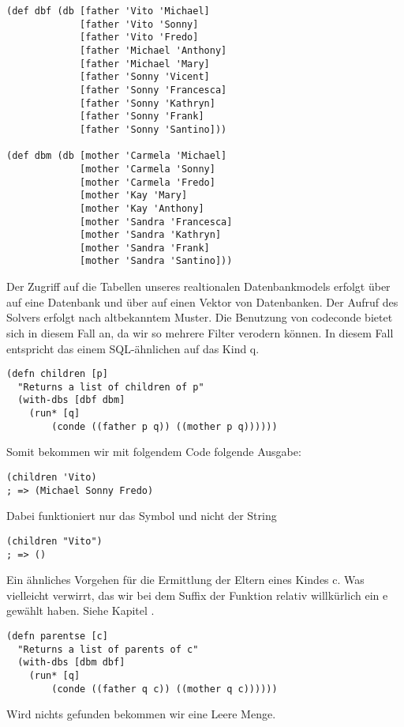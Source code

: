 \begin{lstlisting}
(def dbf (db [father 'Vito 'Michael]
             [father 'Vito 'Sonny]
             [father 'Vito 'Fredo]
             [father 'Michael 'Anthony]
             [father 'Michael 'Mary]
             [father 'Sonny 'Vicent]
             [father 'Sonny 'Francesca]
             [father 'Sonny 'Kathryn]
             [father 'Sonny 'Frank]
             [father 'Sonny 'Santino]))
 
(def dbm (db [mother 'Carmela 'Michael]
             [mother 'Carmela 'Sonny]
             [mother 'Carmela 'Fredo]
             [mother 'Kay 'Mary]
             [mother 'Kay 'Anthony]
             [mother 'Sandra 'Francesca]
             [mother 'Sandra 'Kathryn]
             [mother 'Sandra 'Frank]
             [mother 'Sandra 'Santino]))
\end{lstlisting}
Der Zugriff auf die Tabellen unseres realtionalen Datenbankmodels erfolgt über  auf eine Datenbank und über  auf einen Vektor von Datenbanken. Der Aufruf des Solvers erfolgt nach altbekanntem Muster. Die Benutzung von code{conde} bietet sich in diesem Fall an, da wir so mehrere Filter verodern können. In diesem Fall entspricht das einem SQL-ähnlichen  auf das Kind q.

\begin{lstlisting}
(defn children [p] 
  "Returns a list of children of p"
  (with-dbs [dbf dbm] 
	(run* [q] 
		(conde ((father p q)) ((mother p q))))))
\end{lstlisting}
Somit bekommen wir mit folgendem Code folgende Ausgabe:

\begin{lstlisting}
(children 'Vito)
; => (Michael Sonny Fredo)
\end{lstlisting}
Dabei funktioniert nur das Symbol  und nicht der String 

\begin{lstlisting}
(children "Vito")
; => ()
\end{lstlisting}
Ein ähnliches Vorgehen für die Ermittlung der Eltern eines Kindes \dq{}c\dq{}. Was vielleicht verwirrt, das wir bei dem Suffix der Funktion relativ willkürlich ein e gewählt haben. Siehe Kapitel \emph{}.

\begin{lstlisting}
(defn parentse [c] 
  "Returns a list of parents of c"
  (with-dbs [dbm dbf] 
	(run* [q] 
		(conde ((father q c)) ((mother q c))))))
\end{lstlisting}
Wird nichts gefunden bekommen wir eine Leere Menge.

